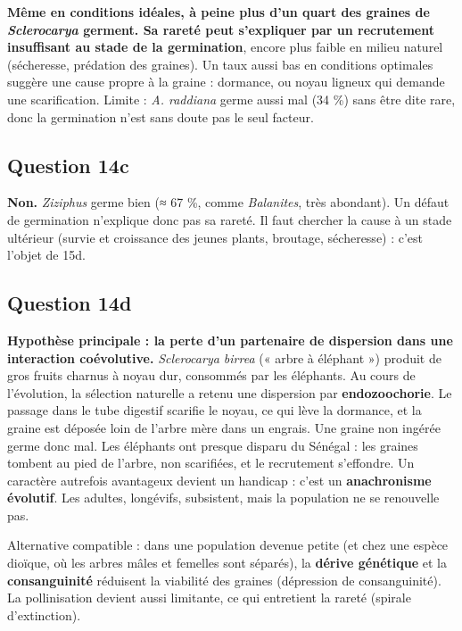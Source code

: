 \documentclass[11pt,a4paper]{article}
\begin{document}
\textbf{Même en conditions idéales, à peine plus d'un quart des graines de \emph{Sclerocarya} germent. Sa rareté peut s'expliquer par un recrutement insuffisant au stade de la germination}, encore plus faible en milieu naturel (sécheresse, prédation des graines). Un taux aussi bas en conditions optimales suggère une cause propre à la graine : dormance, ou noyau ligneux qui demande une scarification. Limite : \emph{A. raddiana} germe aussi mal (34 \%) sans être dite rare, donc la germination n'est sans doute pas le seul facteur.

\hypertarget{question-14c}{%
\subsection{Question 14c}\label{question-14c}}

\textbf{Non.} \emph{Ziziphus} germe bien (≈ 67 \%, comme \emph{Balanites}, très abondant). Un défaut de germination n'explique donc pas sa rareté. Il faut chercher la cause à un stade ultérieur (survie et croissance des jeunes plants, broutage, sécheresse) : c'est l'objet de 15d.

\hypertarget{question-14d}{%
\subsection{Question 14d}\label{question-14d}}

\textbf{Hypothèse principale : la perte d'un partenaire de dispersion dans une interaction coévolutive.} \emph{Sclerocarya birrea} (« arbre à éléphant ») produit de gros fruits charnus à noyau dur, consommés par les éléphants. Au cours de l'évolution, la sélection naturelle a retenu une dispersion par \textbf{endozoochorie}. Le passage dans le tube digestif scarifie le noyau, ce qui lève la dormance, et la graine est déposée loin de l'arbre mère dans un engrais. Une graine non ingérée germe donc mal. Les éléphants ont presque disparu du Sénégal : les graines tombent au pied de l'arbre, non scarifiées, et le recrutement s'effondre. Un caractère autrefois avantageux devient un handicap : c'est un \textbf{anachronisme évolutif}. Les adultes, longévifs, subsistent, mais la population ne se renouvelle pas.

Alternative compatible : dans une population devenue petite (et chez une espèce dioïque, où les arbres mâles et femelles sont séparés), la \textbf{dérive génétique} et la \textbf{consanguinité} réduisent la viabilité des graines (dépression de consanguinité). La pollinisation devient aussi limitante, ce qui entretient la rareté (spirale d'extinction).
\end{document}
